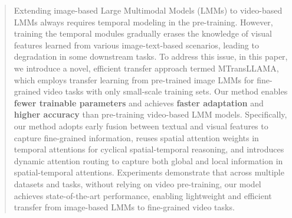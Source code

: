 \begin{abstract}
Extending image-based Large Multimodal Models (LMMs) to video-based LMMs always requires temporal modeling in the pre-training. However, training the temporal modules gradually erases the knowledge of visual features learned from various image-text-based scenarios, leading to degradation in some downstream tasks.
To address this issue, in this paper, we introduce a novel, efficient transfer approach termed MTransLLAMA, which employs transfer learning from pre-trained image LMMs for fine-grained video tasks with only small-scale training sets. Our method enables \textbf{fewer trainable parameters} and achieves \textbf{faster adaptation} and \textbf{higher accuracy} than pre-training video-based LMM models. Specifically, our method adopts early fusion between textual and visual features to capture fine-grained information, reuses spatial attention weights in temporal attentions for cyclical spatial-temporal reasoning, and introduces dynamic attention routing to capture both global and local information in spatial-temporal attentions. Experiments demonstrate that across multiple datasets and tasks, without relying on video pre-training, our model achieves state-of-the-art performance, enabling lightweight and efficient transfer from image-based LMMs to fine-grained video tasks.
\end{abstract}

